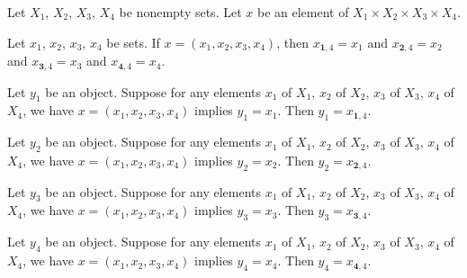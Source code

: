 \documentclass{article}
\begin{document}
Let $X_{1}$, $X_{2}$, $X_{3}$, $X_{4}$ be nonempty sets.
Let $x$ be an element of $X_{1}\times X_{2}\times X_{3}\times X_{4}$.
\begin{thm}
\item\label{mcart1:74} Let $x_{1}$, $x_{2}$, $x_{3}$, $x_{4}$ be sets.
  If $x=(x_{1},x_{2},x_{3},x_{4})$, then
  $x_{\mathbf{1},4}=x_{1}$ and
  $x_{\mathbf{2},4}=x_{2}$ and
  $x_{\mathbf{3},4}=x_{3}$ and
  $x_{\mathbf{4},4}=x_{4}$.
\item\label{mcart1:75} Let $y_{1}$ be an object.
  Suppose for any elements $x_{1}$ of $X_{1}$, $x_{2}$ of $X_{2}$,
  $x_{3}$ of $X_{3}$, $x_{4}$ of $X_{4}$,
  we have $x=(x_{1},x_{2},x_{3},x_{4})$ implies $y_{1}=x_{1}$.
  Then $y_{1}=x_{\mathbf{1},4}$.
\item\label{mcart1:76} Let $y_{2}$ be an object.
  Suppose for any elements $x_{1}$ of $X_{1}$, $x_{2}$ of $X_{2}$,
  $x_{3}$ of $X_{3}$, $x_{4}$ of $X_{4}$,
  we have $x=(x_{1},x_{2},x_{3},x_{4})$ implies $y_{2}=x_{2}$.
  Then $y_{2}=x_{\mathbf{2},4}$.
\item\label{mcart1:77} Let $y_{3}$ be an object.
  Suppose for any elements $x_{1}$ of $X_{1}$, $x_{2}$ of $X_{2}$,
  $x_{3}$ of $X_{3}$, $x_{4}$ of $X_{4}$,
  we have $x=(x_{1},x_{2},x_{3},x_{4})$ implies $y_{3}=x_{3}$.
  Then $y_{3}=x_{\mathbf{3},4}$.
\item\label{mcart1:78} Let $y_{4}$ be an object.
  Suppose for any elements $x_{1}$ of $X_{1}$, $x_{2}$ of $X_{2}$,
  $x_{3}$ of $X_{3}$, $x_{4}$ of $X_{4}$,
  we have $x=(x_{1},x_{2},x_{3},x_{4})$ implies $y_{4}=x_{4}$.
  Then $y_{4}=x_{\mathbf{4},4}$.
\end{thm}
\end{document}
